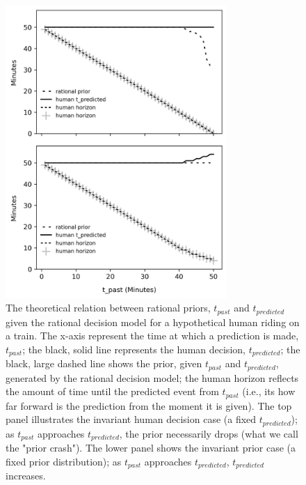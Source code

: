 \begin{figure}
    \centering
    \includegraphics[width=0.75\textwidth]{Figures/Theory_PriorShift_1_2panel.png}
    \caption{\footnotesize{The theoretical relation between rational priors, $t_{past}$ and $t_{predicted}$ given the rational decision model for a hypothetical human riding on a train.  The x-axis represent the time at which a prediction is made, $t_{past}$;  the black, solid line represents the human decision, $t_{predicted}$; the black, large dashed line shows the prior, given $t_{past}$ and $t_{predicted}$, generated by the rational decision model; the human horizon reflects the amount of time until the predicted event from $t_{past}$ (i.e., its how far forward is the prediction from the moment it is given).  The top panel illustrates the invariant human decision case (a fixed $t_{predicted}$); as $t_{past}$ approaches $t_{predicted}$, the prior necessarily drops (what we call the "prior crash").  The lower panel shows the invariant prior case (a fixed prior distribution); as $t_{past}$ approaches $t_{predicted}$, $t_{predicted}$ increases.  
    }}
    \label{fig:PriorShift2Panel}
\end{figure}
